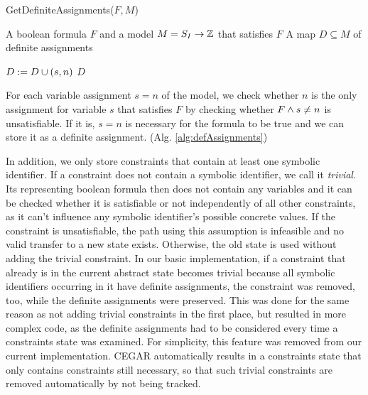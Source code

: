 \begin{algorithm}
\caption{GetDefiniteAssignments($F, M$)}
\label{alg:defAssignments}
\begin{algorithmic}
\Input A boolean formula $F$ and a model $M = S_I \rightarrow \mathbb{Z}$ that satisfies $F$
\Output A map $D\subseteq M$ of definite assignments

	\State $D := D \cup (s, n)$
\EndIf
\EndFor
\Return $D$
\end{algorithmic}
\end{algorithm}
For each variable assignment $s = n$ of the model,
we check whether $n$ is the only assignment for variable $s$ that satisfies $F$ by checking whether $F \wedge s \neq n$ is unsatisfiable.
If it is, $s = n$ is necessary for the formula to be true and we can store it as a definite assignment. (Alg. \ref{alg:defAssignments})

In addition, we only store constraints that contain at least one symbolic identifier.
If a constraint does not contain a symbolic identifier, we call it \emph{trivial}.
Its representing boolean formula then does not contain any variables and it can be checked whether it is satisfiable or not independently of all other constraints, as it can't influence any symbolic identifier's possible concrete values.
If the constraint is unsatisfiable, the path using this assumption is infeasible and no valid transfer to a new state exists.
Otherwise, the old state is used without adding the trivial constraint.
In our basic implementation, if a constraint that already is in the current abstract state becomes trivial because all symbolic identifiers occurring in it have definite assignments, the constraint was removed, too, while the definite assignments were preserved.
This was done for the same reason as not adding trivial constraints in the first place, but resulted in more complex code, as the definite assignments had to be considered every time a constraints state was examined.
For simplicity, this feature was removed from our current implementation. CEGAR automatically results in a constraints state that only contains constraints still necessary, so that such trivial constraints are removed automatically by not being tracked.

